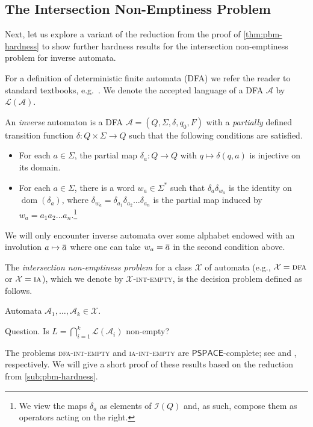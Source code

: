 \documentclass[anonymous,letter,UKenglish,cleveref,autoref,thm-restate]{lipics-v2021}
\makeatletter
\newcommand{\eg}{e.g.~}
\newcommand{\dom}{\operatorname{dom}}
\newcommand{\PSPACE}{\ensuremath{\mathsf{PSPACE}}\xspace}
\newcommand{\ISym}{\cI}
\newcommand\nindent{.5pt}
\newcommand\noverline[1]{\kern\nindent\overline{\kern-\nindent#1\kern-\nindent}\kern\nindent}
\newcommand{\ov}[1]{\noverline{#1}}
\newcommand{\cA}{\mathcal{A}}
\newcommand{\cL}{\mathcal{L}}
\newcommand{\cI}{\mathcal{I}}
\newcommand{\cX}{\mathcal{X}}
\theoremstyle{plain}
\theoremstyle{plain}
\providecommand\iitem{}
\providecommand\qitem{}
\newcommand\decproblem@iitem@label{\rlap{Input.}\phantom{Question.}}
\newcommand\decproblem@qitem@label{Question.}
\newenvironment{decproblem}{\begin{description}\begin{samepage}\renewcommand{\iitem}{\item[\decproblem@iitem@label]}\renewcommand{\qitem}{\item[\decproblem@qitem@label]}}{\end{samepage}\end{description}}
\newcommand{\prob}[1]{\textup{\textsc{#1}}\xspace}
\newcommand{\dIEmpty}[1]{\prob{{#1}-int-empty}}
\makeatother
\begin{document}
\subsection{The Intersection Non-Emptiness Problem}\label{sub:iai-hardness}

Next, let us explore a variant of the reduction from the proof of \cref{thm:pbm-hardness} to show further hardness results for the intersection non-emptiness problem for inverse automata.

For a definition of deterministic finite automata (DFA) we refer the reader to  standard textbooks, \eg \cite{HU}.
We denote the accepted language of a DFA $\cA$ by $\cL(\cA)$.

An \emph{inverse} automaton is a DFA $\cA = (Q,\Sigma, \delta, q_0, F)$ with a \emph{partially} defined transition function $\delta\colon Q  \times \Sigma \to Q$ such that the following conditions are satisfied.
\begin{itemize}
  \item For each $a \in \Sigma$, the partial map $\delta_a\colon Q \to Q$ with $q \mapsto \delta(q,a)$ is injective on its domain. 
  \item For each $a \in \Sigma$, there is a word $w_a \in \Sigma^\ast$ such that $\delta_a \delta_{w_a}$ is the identity on $\dom(\delta_a)$, where $\delta_{w_a} = \delta_{a_1}\delta_{a_2} \dotsc \delta_{a_n}$ is the partial map induced by $w_a = a_1 a_2 \dotsc a_n$.\footnote{We view the maps $\delta_a$ as elements of $\ISym(Q)$ and, as such, compose them as operators acting on the right.}
\end{itemize}
\begin{remark}
  We will only encounter inverse automata over some alphabet endowed with an involution $a \mapsto \ov a$ where one can take $w_a = \ov a$ in the second condition above.
\end{remark}

The \emph{intersection non-emptiness problem} for a class $\cX$ of automata (e.g., $\cX = \textsc{dfa}$ or $\cX = \textsc{ia}$), which we denote by \dIEmpty{$\cX$}, is the decision problem defined as follows.

\begin{decproblem}
  \iitem Automata $\cA_1, \dotsc, \cA_k \in \cX$.
  \qitem Is $L = \bigcap_{i=1}^k\cL(\cA_i)$ non-empty?
\end{decproblem}

The problems \dIEmpty{dfa} and \dIEmpty{ia} are \PSPACE-complete; see \cite{koz77} and \cite{BirgetMMW94}, respectively.
We will give a short proof of these results based on the reduction from \cref{sub:pbm-hardness}.
\end{document}
